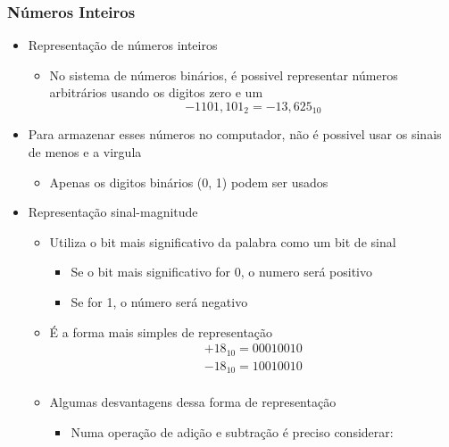 \documentclass[12pt]{article}
\begin{document}
        \subsubsection{Números Inteiros}
        \begin{itemize}
            \item Representação de números inteiros
            \begin{itemize}
                \item No sistema de números binários, é possivel representar 
                números arbitrários usando os digitos zero e um \
                \[-1101,101_2 = -13,625_{10}\]                
            \end{itemize}
            \item Para armazenar esses números no computador, não é possivel 
            usar os sinais de menos e a virgula
            \begin{itemize}
                \item Apenas os digitos binários (0, 1) podem ser usados
            \end{itemize}
            \item Representação sinal-magnitude
            \begin{itemize}
                \item Utiliza o bit mais significativo da palabra como um bit 
                de sinal
                \begin{itemize}
                    \item Se o bit mais significativo for 0, o numero será 
                    positivo
                    \item Se for 1, o número será negativo
                \end{itemize}
                \item É a forma mais simples de representação
                \[
                \begin{array}{l}
                    +18_{10} = 00010010 \\
                    -18_{10} = 10010010 \\
                \end{array}
                \]
                \item Algumas desvantagens dessa forma de representação
                \begin{itemize}
                    \item Numa operação de adição e subtração é preciso considerar:
                    \begin{itemize}

\end{itemize}
\end{itemize}
\end{itemize}
\end{itemize}
\end{document}
